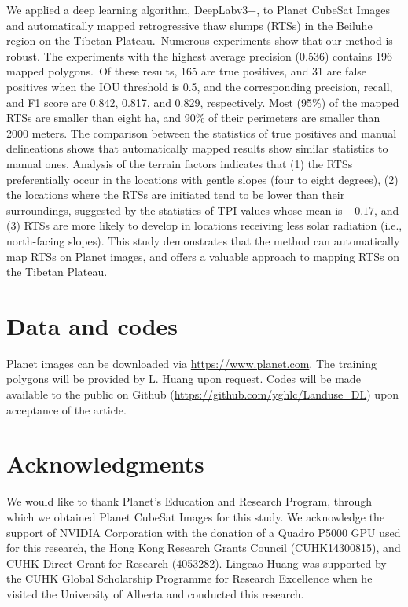 \documentclass[authoryear,preprint,review,12pt]{elsarticle}
\begin{document}
We applied a deep learning algorithm, DeepLabv3+, to Planet CubeSat Images and automatically mapped retrogressive thaw slumps (RTSs) in the Beiluhe region on the Tibetan Plateau.~Numerous experiments show that our method is robust. The experiments with the highest average precision (0.536) contains 196 mapped polygons.~Of these  results, 165 are true positives, and 31 are false positives when the IOU threshold is 0.5, and the corresponding precision, recall, and F1 score are 0.842, 0.817, and 0.829, respectively. Most (95\%) of the mapped RTSs are smaller than eight ha, and 90\% of their perimeters are smaller than 2000 meters. The comparison between the statistics of true positives and manual delineations shows that automatically mapped results show similar statistics to manual ones. Analysis of the terrain factors indicates that (1) the RTSs preferentially occur in the locations with gentle slopes (four to eight degrees), (2) the locations where the RTSs are initiated tend to be lower than their surroundings, suggested by the statistics of TPI values whose mean is $-0.17$, and (3) RTSs are more likely to develop in locations receiving less solar radiation (i.e., north-facing slopes). This study demonstrates that the method can automatically map RTSs on Planet images, and offers a valuable approach to mapping RTSs on the Tibetan Plateau.
 

\section{Data and codes}
\label{sec_data_codes}

Planet images can be downloaded via \url{https://www.planet.com}. The training polygons will be provided by L. Huang upon request. 
Codes will be made available to the public on Github (\url{https://github.com/yghlc/Landuse\_DL}) upon acceptance of the article. 


\section{Acknowledgments}
\label{sec_acknowledgments}

We would like to thank Planet’s Education and Research Program, through which we obtained Planet CubeSat Images for this study. We acknowledge the support of NVIDIA Corporation with the donation of a Quadro P5000 GPU used for this research, the Hong Kong Research Grants Council (CUHK14300815), and CUHK Direct Grant for Research (4053282). Lingcao Huang was supported by the CUHK Global Scholarship Programme for Research Excellence when he visited the University of Alberta and conducted this research.
\end{document}

